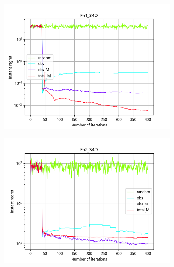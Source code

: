 \documentclass{article}
\begin{document}
\begin{figure}[H]
    \centering
    \begin{subfigure}[t]{.32\linewidth}
        \centering
        \includegraphics[width=1\textwidth]{pictures/Homo_noise_4D/S/Fn1_S4D_ins.png}
    \end{subfigure}
    \begin{subfigure}[t]{.32\linewidth}
        \centering
        \includegraphics[width=1\textwidth]{pictures/Homo_noise_4D/S/Fn2_S4D_ins.png}
    \end{subfigure}
    \begin{subfigure}[t]{.32\linewidth}
        \centering

\end{subfigure}
\end{figure}
\end{document}
